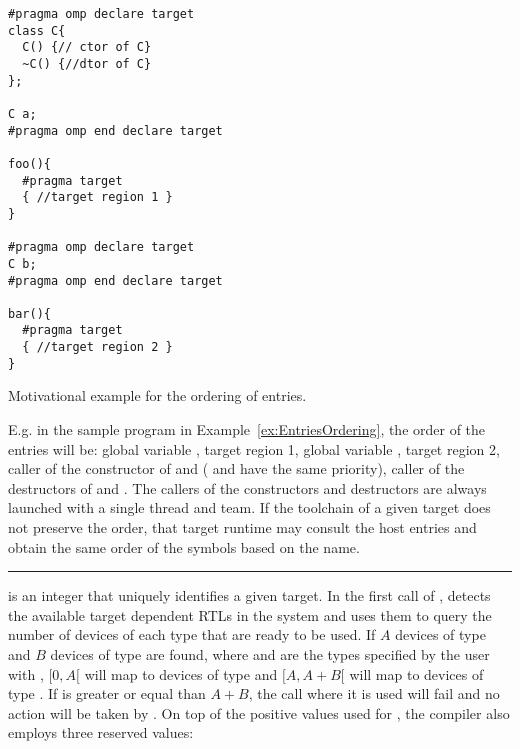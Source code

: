 \begin{example}
\lstset{basicstyle=\scriptsize,frame=single}
\begin{lstlisting}
#pragma omp declare target
class C{
  C() {// ctor of C}
  ~C() {//dtor of C}
};

C a;
#pragma omp end declare target

foo(){
  #pragma target
  { //target region 1 }
}

#pragma omp declare target
C b;
#pragma omp end declare target

bar(){
  #pragma target
  { //target region 2 }
}
\end{lstlisting}
\lstset{basicstyle=\small\bfseries,frame=none}
\caption{Motivational example for the ordering of entries.}
\label{ex:EntriesOrdering}
\end{example}
%
E.g. in the sample program in Example~\ref{ex:EntriesOrdering}, the order of the entries will be: global variable , target region 1, global variable , target region 2, caller of the constructor of  and  ( and  have the same priority), caller of the destructors of  and . The callers of the constructors and destructors are always launched with a single thread and team. If the toolchain of a given target does not preserve the order, that target runtime may consult the host entries and obtain the same order of the symbols based on the name.

\noindent\rule{\textwidth}{0.4pt}

 is an integer that uniquely identifies a given target. In the first call of , \libomptarget{} detects the available target dependent RTLs in the system and uses them to query the number of devices of each type that are ready to be used. If $A$ devices of type  and $B$ devices of type  are found, where  and  are the types specified by the user with ,  $[0,A[$ will map to devices of type  and  $[A,A+B[$ will map to devices of type . If  is greater or equal than $A+B$, the call where it is used will fail and no action will be taken by \libomptarget{}. On top of the positive values used for , the compiler also employs three reserved values:


